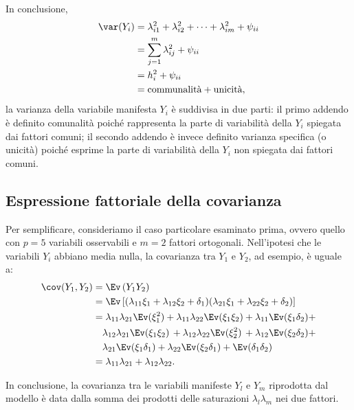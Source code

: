 In conclusione,
\begin{align}
  \var(Y_i) &= \lambda_{i1}^2 + \lambda_{i2}^2 + \dots + \lambda_{im}^2 + \psi_{ii} \notag\\
  &= \sum_{j=1}^m \lambda_{ij}^2 + \psi_{ii}\notag\\
  &= h_i^2 + \psi_{ii}\notag\\
  &=\text{communalità} + \text{unicità},\notag
\end{align}
la varianza della variabile manifesta $Y_i$ è suddivisa in due parti: il primo addendo è definito comunalità poiché  rappresenta la parte di variabilità della $Y_i$ spiegata dai fattori comuni; il secondo addendo è  invece definito varianza specifica (o unicità) poiché esprime la parte di variabilità della $Y_i$ non spiegata dai fattori comuni.


\subsection{Espressione fattoriale della covarianza}

Per semplificare, consideriamo il caso particolare esaminato prima, ovvero quello con $p=5$ variabili osservabili e $m=2$ fattori ortogonali. 
Nell'ipotesi che le variabili $Y_i$ abbiano media nulla, la covarianza 
tra $Y_1$ e $Y_2$, ad esempio, è uguale a:
\begin{align}
  \cov(Y_1, Y_2) &= \Ev\left( Y_1 Y_2\right) \notag\\
  &= \Ev \left[ 
  (\lambda_{11} \xi_1 + \lambda_{12} \xi_2 + \delta_1)
   (\lambda_{21} \xi_1 + \lambda_{22} \xi_2 +  \delta_2)
  \right]\notag\\
  &= \lambda_{11} \lambda_{21} \Ev (\xi_1^2) +
      \lambda_{11} \lambda_{22} \Ev (\xi_1 \xi_2) +\notag 
      \lambda_{11} \Ev (\xi_1 \delta_2) +\notag\\
    &\quad \lambda_{12} \lambda_{21}\Ev(\xi_1 \xi_2)\, + 
      \lambda_{12} \lambda_{22}\Ev(\xi^2_2)\, + 
      \lambda_{12} \Ev (\xi_2\delta_2) +\notag\\
    &\quad \lambda_{21} \Ev(\xi_1\delta_1) +\notag 
     \lambda_{22} \Ev(\xi_2\delta_1) + \Ev(\delta_1 \delta_2)\notag\\
   &= \lambda_{11} \lambda_{21} + \lambda_{12} \lambda_{22}.\notag
\end{align}

In conclusione, la covarianza tra le variabili manifeste $Y_l$ e $Y_m$ riprodotta dal modello è data dalla somma dei prodotti delle saturazioni $\lambda_l \lambda_m$ nei due fattori.


